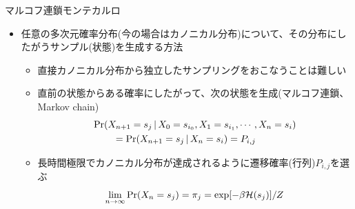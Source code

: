 
\begin{frame}[t,fragile]{マルコフ連鎖モンテカルロ}
  \begin{itemize}
  \item 任意の多次元確率分布(今の場合はカノニカル分布)について、その分布にしたがうサンプル(状態)を生成する方法
    \begin{itemize}
    \item 直接カノニカル分布から独立したサンプリングをおこなうことは難しい
    \item 直前の状態からある確率にしたがって、次の状態を生成(マルコフ連鎖、Markov chain)
      \[
      \begin{split}
        &{\rm Pr}(X_{n+1}=s_j \,|\, X_0 = s_{i_0}, X_1 = s_{i_1}, \cdots, X_n = s_{i}) \\
        & \qquad = {\rm Pr}(X_{n+1}=s_j \,|\, X_n = s_{i}) = P_{i,j}
      \end{split}
      \]
    \item 長時間極限でカノニカル分布が達成されるように遷移確率(行列)$P_{i,j}$を選ぶ
      \[
      \lim_{n\rightarrow\infty}{\rm Pr}(X_n=s_j) = \pi_j = \exp[-\beta {\cal H}(s_j)] / Z
      \]
    \end{itemize}
  \end{itemize}
\end{frame}
